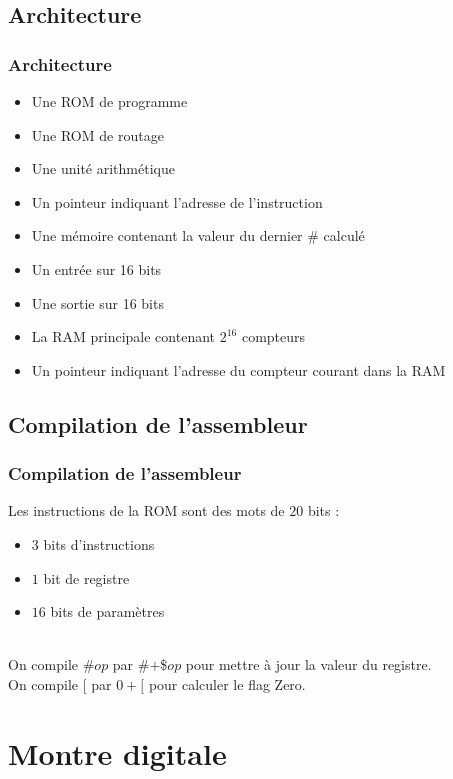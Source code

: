 \documentclass{beamer}
\begin{document}
	\subsection{Architecture}
	\begin{frame}
		\frametitle{Architecture}
        \begin{itemize}
            \item Une ROM de programme
				\pause
            \item Une ROM de routage
				\pause
			\item Une unité arithmétique
				\pause
            \item Un pointeur indiquant l'adresse de l'instruction
				\pause
            \item Une mémoire contenant la valeur du dernier \# calculé
				\pause
			\item Un entrée sur 16 bits
            \item Une sortie sur 16 bits
				\pause
			\item La RAM principale contenant $2^{16}$ compteurs
            \item Un pointeur indiquant l'adresse du compteur courant dans la RAM
        \end{itemize}
	\end{frame}

	\subsection{Compilation de l'assembleur}
	\begin{frame}
		\frametitle{Compilation de l'assembleur}
		Les instructions de la ROM sont des mots de $20$ bits :
		\pause
		\begin{itemize}
			\item $3$ bits d'instructions
			\pause
			\item $1$ bit de registre
			\pause
			\item $16$ bits de paramètres
		\end{itemize}
		\pause
		~\\
		On compile \#$op$ par \#$+$\$$op$ pour mettre à jour la valeur du
		registre.\pause \\
		On compile $[$ par $0+[$ pour calculer le flag Zero.
	\end{frame}

	\section{Montre digitale}
\end{document}
